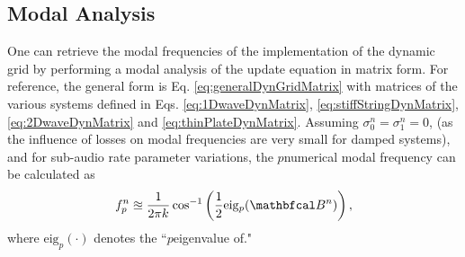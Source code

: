 \documentclass[fleqn]{jaes}
\def\SWcomment[#1]{\textcolor{blue}{#1}}
\begin{document}

\subsection{Modal Analysis}
One can retrieve the modal frequencies of the implementation of the dynamic grid by performing a modal analysis of the update equation in matrix form. For reference, the general form is Eq. \eqref{eq:generalDynGridMatrix} with matrices of the various systems defined in Eqs. \eqref{eq:1DwaveDynMatrix}, \eqref{eq:stiffStringDynMatrix}, \eqref{eq:2DwaveDynMatrix} and \eqref{eq:thinPlateDynMatrix}. Assuming $\sigma_0^n = \sigma_1^n = 0$, (as the influence of losses on modal frequencies are very small for damped systems), and for sub-audio rate parameter variations, the $p$\th numerical modal frequency can be calculated as
\begin{equation}\label{eq:modalAnalysis}
    f_p^n \approxeq \frac{1}{2 \pi k}\cos^{-1}\left(\frac{1}{2}\text{eig}_p(\BB)\right),
\end{equation}
where $\text{eig}_p(\cdot)$ denotes the ``$p$\th eigenvalue of."
\end{document}
